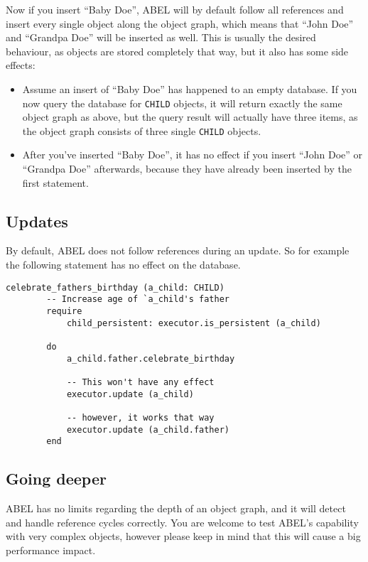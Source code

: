 Now if you insert ``Baby Doe'', ABEL will by default follow all references and insert every single object along the object graph, which means that ``John Doe'' and ``Grandpa Doe'' will be inserted as well.
This is usually the desired behaviour, as objects are stored completely that way, but it also has some side effects:

\begin{itemize}
\item Assume an insert of ``Baby Doe'' has happened to an empty database. 
If you now query the database for \lstinline!CHILD! objects, it will return exactly the same object graph as above, but the query result will actually have three items, as the object graph consists of three single \lstinline!CHILD! objects.
	
\item After you've inserted ``Baby Doe'', it has no effect if you insert ``John Doe'' or ``Grandpa Doe'' afterwards, because they have already been inserted by the first statement.
\end{itemize}

\subsection{Updates}

By default, ABEL does not follow references during an update. 
So for example the following statement has no effect on the database.

\begin{lstlisting}[language=OOSC2Eiffel, captionpos=b, caption={}, label={lst:reference_update}]
	celebrate_fathers_birthday (a_child: CHILD)
		-- Increase age of `a_child's father
		require
			child_persistent: executor.is_persistent (a_child)

		do
			a_child.father.celebrate_birthday

			-- This won't have any effect
			executor.update (a_child)

			-- however, it works that way
			executor.update (a_child.father)
		end
\end{lstlisting}

\subsection{Going deeper}

ABEL has no limits regarding the depth of an object graph, and it will detect and handle reference cycles correctly. 
You are welcome to test ABEL's capability with very complex objects, however please keep in mind that this will cause a big performance impact.

